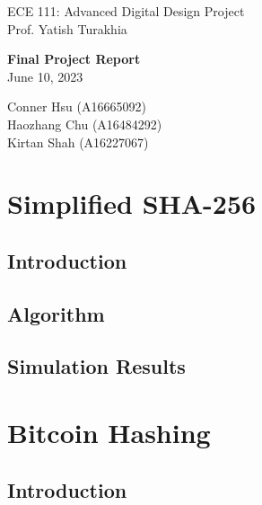 \documentclass{article}
\begin{document}
\begin{titlepage}
   \begin{center}

       \large ECE 111: Advanced Digital Design Project \\
       Prof. Yatish Turakhia
       \vfill

       \LARGE\textbf{Final Project Report} \\
   \vspace{0.8cm}
       \large June 10, 2023 \\

       \vfill

       Conner Hsu (A16665092) \\
       Haozhang Chu (A16484292) \\
       Kirtan Shah (A16227067)

       \date{\today}

   \end{center}
\end{titlepage}

\tableofcontents

\newpage
\section{Simplified SHA-256}

\subsection{Introduction}


\subsection{Algorithm}


\subsection{Simulation Results}


\newpage
\section{Bitcoin Hashing}

\subsection{Introduction}
\end{document}
